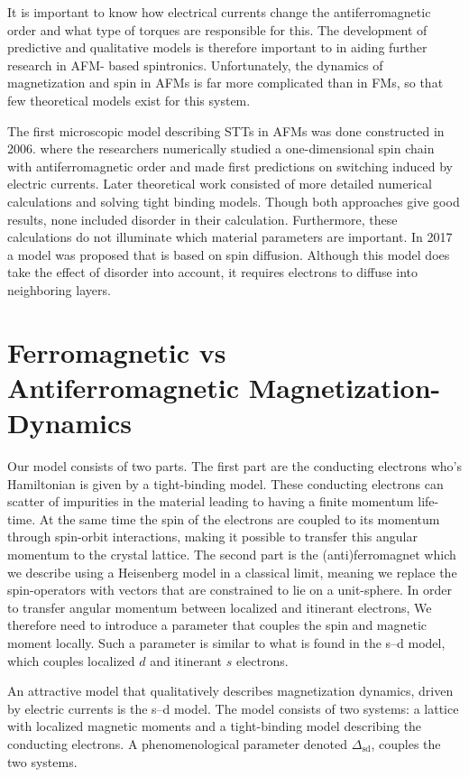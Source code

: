 It is important to know how electrical currents change the antiferromagnetic order and what
type of torques are responsible for this. The development of predictive and qualitative models is therefore important to in aiding further research in AFM- based spintronics.
Unfortunately, the dynamics of magnetization and spin in AFMs is far more complicated
than in FMs, so that few theoretical models exist for this system.

The first microscopic model describing STTs in AFMs was done constructed in 2006. where
the researchers numerically studied a one-dimensional spin chain with antiferromagnetic
order and made first predictions on switching induced by electric currents. Later
theoretical work consisted of more detailed numerical calculations and solving tight binding
models. Though both approaches give good results, none included disorder in their
calculation. Furthermore, these calculations do not illuminate which material
parameters are important. In 2017 a model was proposed that is based on spin
diffusion. Although this model does take the effect of disorder into account, it requires
electrons to diffuse into neighboring layers. 

\section{Ferromagnetic vs Antiferromagnetic Magnetization-Dynamics}
Our model consists of two parts. The first part are the conducting electrons who's Hamiltonian is given by a tight-binding model. These conducting electrons can scatter of impurities in the material leading to having a finite momentum life-time. At the same time the spin of the electrons are coupled to its momentum through spin-orbit interactions, making it possible to transfer this angular momentum to the crystal lattice. The second part is the (anti)ferromagnet which we describe using a Heisenberg model in a classical limit, meaning we replace the spin-operators with vectors that are constrained to lie on a unit-sphere. In order to transfer angular momentum between localized and itinerant electrons, We therefore need to introduce a parameter that couples the spin and magnetic moment locally. Such a parameter is similar to what is found in the s--d model, which couples localized $d$ and itinerant $s$ electrons. 

An attractive model that qualitatively describes magnetization dynamics, driven by electric currents is the s--d model. The model consists of two systems: a lattice with localized magnetic moments and a tight-binding model describing the conducting electrons. A phenomenological parameter denoted $\Delta_\text{sd}$, couples the two systems. 

